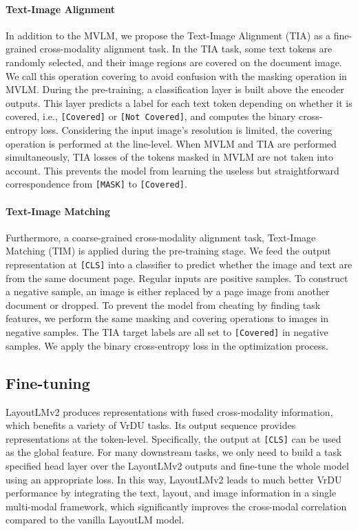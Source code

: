 \documentclass{article} \usepackage{iclr2021_conference,times}
\begin{document}
\paragraph{Text-Image Alignment}

In addition to the MVLM, we propose the Text-Image Alignment (TIA) as a fine-grained cross-modality alignment task. In the TIA task, some text tokens are randomly selected, and their image regions are covered on the document image. We call this operation covering to avoid confusion with the masking operation in MVLM. During the pre-training, a classification layer is built above the encoder outputs. This layer predicts a label for each text token depending on whether it is covered, i.e., {\tt[Covered]} or {\tt[Not Covered]}, and computes the binary cross-entropy loss.
Considering the input image's resolution is limited, the covering operation is performed at the line-level.
When MVLM and TIA are performed simultaneously, TIA losses of the tokens masked in MVLM are not taken into account. This prevents the model from learning the useless but straightforward correspondence from {\tt[MASK]} to {\tt[Covered]}.

\paragraph{Text-Image Matching}

Furthermore, a coarse-grained cross-modality alignment task, Text-Image Matching (TIM) is applied during the pre-training stage. We feed the output representation at {\tt[CLS]} into a classifier to predict whether the image and text are from the same document page. Regular inputs are positive samples. To construct a negative sample, an image is either replaced by a page image from another document or dropped. To prevent the model from cheating by finding task features, we perform the same masking and covering operations to images in negative samples. The TIA target labels are all set to {\tt[Covered]} in negative samples. We apply the binary cross-entropy loss in the optimization process.

\subsection{Fine-tuning}

LayoutLMv2 produces representations with fused cross-modality information, which benefits a variety of VrDU tasks. Its output sequence provides representations at the token-level. Specifically, the output at {\tt[CLS]} can be used as the global feature. For many downstream tasks, we only need to build a task specified head layer over the LayoutLMv2 outputs and fine-tune the whole model using an appropriate loss. In this way, LayoutLMv2 leads to much better VrDU performance by integrating the text, layout, and image information in a single multi-modal framework, which significantly improves the cross-modal correlation compared to the vanilla LayoutLM model.
\end{document}
